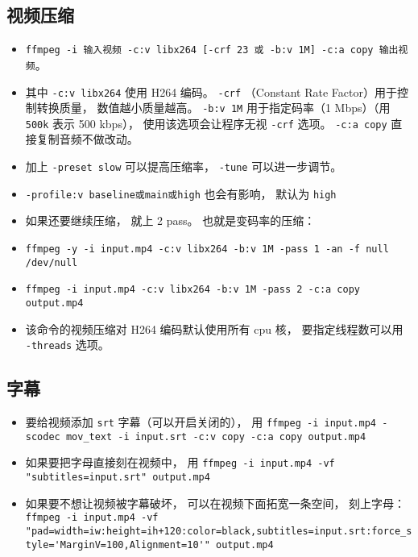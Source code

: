 \subsection{视频压缩}
\begin{itemize}
\item \verb|ffmpeg -i 输入视频 -c:v libx264 [-crf 23 或 -b:v 1M] -c:a copy 输出视频|。
\item 其中 \verb|-c:v libx264| 使用 H264 编码。 \verb|-crf| （Constant Rate Factor）用于控制转换质量， 数值越小质量越高。 \verb|-b:v 1M| 用于指定码率（1 Mbps）（用 \verb|500k| 表示 500 kbps）， 使用该选项会让程序无视 \verb|-crf| 选项。 \verb|-c:a copy| 直接复制音频不做改动。
\item 加上 \verb|-preset slow| 可以提高压缩率， \verb|-tune| 可以进一步调节。
\item \verb|-profile:v baseline或main或high| 也会有影响， 默认为 \verb|high|
\item 如果还要继续压缩， 就上 2 pass。 也就是变码率的压缩：
\item \verb|ffmpeg -y -i input.mp4 -c:v libx264 -b:v 1M -pass 1 -an -f null /dev/null|
\item \verb|ffmpeg -i input.mp4 -c:v libx264 -b:v 1M -pass 2 -c:a copy output.mp4|
\item 该命令的视频压缩对 H264 编码默认使用所有 cpu 核， 要指定线程数可以用 \verb|-threads| 选项。
\end{itemize}

\subsection{字幕}
\begin{itemize}
\item 要给视频添加 \verb|srt| 字幕（可以开启关闭的）， 用 \verb|ffmpeg -i input.mp4 -scodec mov_text -i input.srt -c:v copy -c:a copy output.mp4|
\item 如果要把字母直接刻在视频中， 用 \verb|ffmpeg -i input.mp4 -vf "subtitles=input.srt" output.mp4|
\item 如果要不想让视频被字幕破坏， 可以在视频下面拓宽一条空间， 刻上字母： \verb|ffmpeg -i input.mp4 -vf "pad=width=iw:height=ih+120:color=black,subtitles=input.srt:force_style='MarginV=100,Alignment=10'" output.mp4|
\end{itemize}
